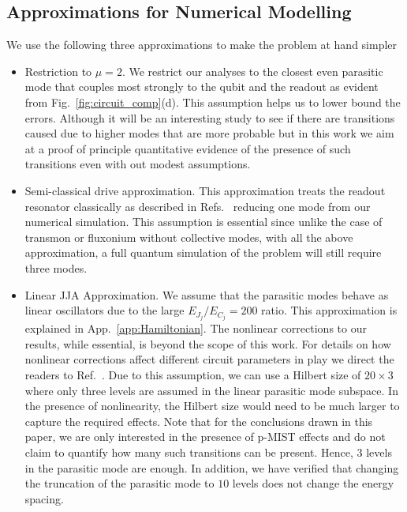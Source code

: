 \documentclass[prx,showpacs,notitlepage,twocolumn,superscriptaddress,nofootinbib,preprintnumbers,floatfix]{revtex4-2}
\begin{document}
\subsection{Approximations for Numerical Modelling}
We use the following three approximations to make the problem at hand simpler
\begin{itemize}
    \item Restriction to $\mu=2$. We restrict our analyses to the closest even parasitic mode that couples most strongly to the qubit and the readout as evident from Fig.~\ref{fig:circuit_comp}(d). This assumption helps us to lower bound the errors. Although it will be an interesting study to see if there are transitions caused due to higher modes that are more probable but in this work we aim at a proof of principle quantitative evidence of the presence of such transitions even with out modest assumptions.

    \item Semi-classical drive approximation. This approximation treats the readout resonator classically as described in Refs.~\cite{xiao2023diagrammatic,dumas2024unified,cohen2023reminiscence,khezri2023measurement} reducing one mode from our numerical simulation. This assumption is essential since unlike the case of transmon or fluxonium without collective modes, with all the above approximation, a full quantum simulation of the problem will still require three modes.

    \item Linear JJA Approximation. We assume that the parasitic modes behave as linear oscillators due to the large $E_{J_j}/E_{C_j}=200$ ratio. This approximation is explained in App.~\ref{app:Hamiltonian}. The nonlinear corrections to our results, while essential, is beyond the scope of this work. For details on how nonlinear corrections affect different circuit parameters in play we direct the readers to Ref.~\cite{viola2015collective}. Due to this assumption, we can use a Hilbert size of $20\times 3$ where only three levels are assumed in the linear parasitic mode subspace. In the presence of nonlinearity, the Hilbert size would need to be much larger to capture the required effects. Note that for the conclusions drawn in this paper, we are only interested in the presence of p-MIST effects and do not claim to quantify how many such transitions can be present. Hence, $3$ levels in the parasitic mode are enough. In addition, we have verified that changing the truncation of the parasitic mode to $10$ levels does not change the energy spacing.
\end{itemize}
\end{document}
